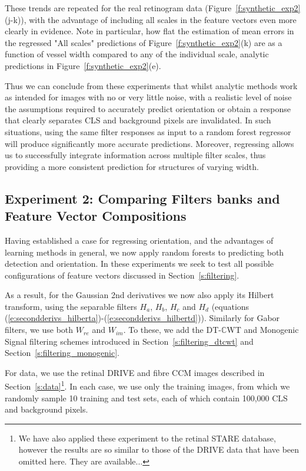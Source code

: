 \documentclass{IEEEtran}
\newcommand{\fref}[1]{Figure~\ref{#1}}
\newcommand{\eref}[1]{(\ref{#1})}
\newcommand{\sref}[1]{Section~\ref{#1}}
\def\dtcwt{DT-$\mathbb{C}$WT}
\begin{document}
These trends are repeated for the real retinogram data (\fref{f:synthetic_exp2}(j-k)), with the advantage of including all scales in the feature vectors even more clearly in evidence. Note in particular, how flat the estimation of mean errors in the regressed "All scales" predictions of \fref{f:synthetic_exp2}(k) are as a function of vessel width compared to any of the individual scale, analytic predictions in \fref{f:synthetic_exp2}(e).

Thus we can conclude from these experiments that whilst analytic methods work as intended for images with no or very little noise, with a realistic level of noise the assumptions required to accurately predict orientation or obtain a response that clearly separates CLS and background pixels are invalidated. In such situations, using the same filter responses as input to a random forest regressor will produce significantly more accurate predictions. Moreover, regressing allows us to successfully integrate information across multiple filter scales, thus providing a more consistent prediction for structures of varying width.



\subsection{Experiment 2: Comparing Filters banks and Feature Vector Compositions}
\label{s:experiments_2}

Having established a case for regressing orientation, and the advantages of learning methods in general, we now apply random forests to predicting both detection and orientation. In these experiments we seek to test all possible configurations of feature vectors discussed in \sref{s:filtering}.

As a result, for the Gaussian 2nd derivatives we now also apply its Hilbert transform, using the separable filters $H_a$, $H_b$, $H_c$ and $H_d$ (equations \eref{e:secondderivs_hilberta}-\eref{e:secondderivs_hilbertd}). Similarly for Gabor filters, we use both $W_{re}$ and $W_{im}$. To these, we add the \dtcwt{} and Monogenic Signal filtering schemes introduced in \sref{s:filtering_dtcwt} and \sref{s:filtering_monogenic}.

For data, we use the retinal DRIVE and fibre CCM images described in \sref{s:data}\footnote{We have also applied these experiment to the retinal STARE database, however the results are so similar to those of the DRIVE data that have been omitted here. They are available...}. In each case, we use only the training images, from which we randomly sample 10 training and test sets, each of which contain 100,000 CLS and background pixels.
\end{document}
